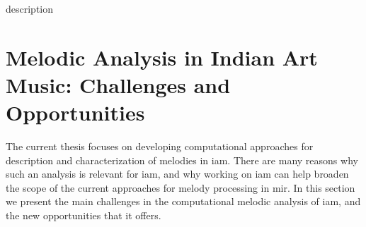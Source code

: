 description 
\section{Melodic Analysis in Indian Art Music: Challenges and Opportunities}
\label{sec:intro_challenges_oppurtunities}

The current thesis focuses on developing computational approaches for description and characterization of melodies in \gls{iam}. There are many reasons why such an analysis is relevant for \gls{iam}, and why working on \gls{iam} can help broaden the scope of the current approaches for melody processing in \gls{mir}. In this section we present the main challenges in the computational melodic analysis of \gls{iam}, and the new opportunities that it offers. 


